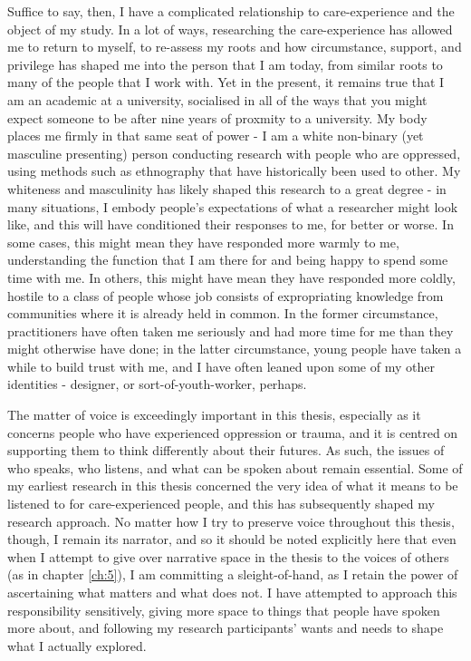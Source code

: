 Suffice to say, then, I have a complicated relationship to care-experience and the object of my study. In a lot of ways, researching the care-experience has allowed me to return to myself, to re-assess my roots and how circumstance, support, and privilege has shaped me into the person that I am today, from similar roots to many of the people that I work with. Yet in the present, it remains true that I am an academic at a university, socialised in all of the ways that you might expect someone to be after nine years of proxmity to a university. My body places me firmly in that same seat of power - I am a white non-binary (yet masculine presenting) person conducting research with people who are oppressed, using methods such as ethnography that have historically been used to other. My whiteness and masculinity has likely shaped this research to a great degree - in many situations, I embody people’s expectations of what a researcher might look like, and this will have conditioned their responses to me, for better or worse. In some cases, this might mean they have responded more warmly to me, understanding the function that I am there for and being happy to spend some time with me. In others, this might have mean they have responded more coldly, hostile to a class of people whose job consists of expropriating knowledge from communities where it is already held in common. In the former circumstance, practitioners have often taken me seriously and had more time for me than they might otherwise have done; in the latter circumstance, young people have taken a while to build trust with me, and I have often leaned upon some of my other identities - designer, or sort-of-youth-worker, perhaps. 

The matter of voice is exceedingly important in this thesis, especially as it concerns people who have experienced oppression or trauma, and it is centred on supporting them to think differently about their futures. As such, the issues of who speaks, who listens, and what can be spoken about remain essential. Some of my earliest research in this thesis concerned the very idea of what it means to be listened to for care-experienced people, and this has subsequently shaped my research approach. No matter how I try to preserve voice throughout this thesis, though, I remain its narrator, and so it should be noted explicitly here that even when I attempt to give over narrative space in the thesis to the voices of others (as in chapter \ref{ch:5}), I am committing a sleight-of-hand, as I retain the power of ascertaining what matters and what does not. I have attempted to approach this responsibility sensitively, giving more space to things that people have spoken more about, and following my research participants’ wants and needs to shape what I actually explored. 

